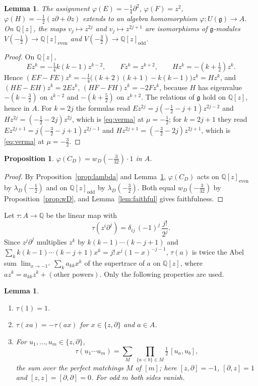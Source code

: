 \documentclass[preprint,12pt]{elsarticle}
\newtheorem{proposition}[theorem]{Proposition}
\newtheorem{lemma}[theorem]{Lemma}
\theoremstyle{definition}
\newcommand{\Q}{\mathbb{Q}}
\newcommand{\g}{\mathfrak{g}}
\newcommand{\Ue}{U(\g)}
\newcommand{\dd}{\partial}
\begin{document}
\begin{lemma}\label{lem:osc}
The assignment $\varphi(E)=-\frac14\dd^2$, $\varphi(F)=z^2$, $\varphi(H)=-\frac12(z\dd+\dd z)$ extends to an algebra homomorphism $\varphi\colon\Ue\to A$. On $\Q[z]$, the maps $v_j\mapsto z^{2j}$ and $v_j\mapsto z^{2j+1}$ are isomorphisms of $\g$-modules $V(-\frac12)\to\Q[z]_{\mathrm{even}}$ and $V(-\frac32)\to\Q[z]_{\mathrm{odd}}$.
\end{lemma}

\begin{proof}
On $\Q[z]$,
\[
Ez^k=-\tfrac14k(k-1)z^{k-2},\qquad Fz^k=z^{k+2},\qquad Hz^k=-(k+\tfrac12)z^k .
\]
Hence $(EF-FE)z^k=-\frac14\bigl((k+2)(k+1)-k(k-1)\bigr)z^k=Hz^k$, and $(HE-EH)z^k=2Ez^k$, $(HF-FH)z^k=-2Fz^k$, because $H$ has eigenvalue $-(k-\frac32)$ on $z^{k-2}$ and $-(k+\frac52)$ on $z^{k+2}$. The relations of $\g$ hold on $\Q[z]$, hence in $A$. For $k=2j$ the formulas read $Ez^{2j}=j(-\frac12-j+1)z^{2j-2}$ and $Hz^{2j}=(-\frac12-2j)z^{2j}$, which is \eqref{eq:verma} at $\mu=-\frac12$; for $k=2j+1$ they read $Ez^{2j+1}=j(-\frac32-j+1)z^{2j-1}$ and $Hz^{2j+1}=(-\frac32-2j)z^{2j+1}$, which is \eqref{eq:verma} at $\mu=-\frac32$.
\end{proof}

\begin{proposition}\label{prop:scalar}
$\varphi(C_D)=w_D(-\frac{3}{32})\cdot1$ in $A$.
\end{proposition}

\begin{proof}
By Proposition~\ref{prop:lambda} and Lemma~\ref{lem:osc}, $\varphi(C_D)$ acts on $\Q[z]_{\mathrm{even}}$ by $\lambda_D(-\frac12)$ and on $\Q[z]_{\mathrm{odd}}$ by $\lambda_D(-\frac32)$. Both equal $w_D(-\frac{3}{32})$ by Proposition~\ref{prop:wD}, and Lemma~\ref{lem:faithful} gives faithfulness.
\end{proof}

Let $\tau\colon A\to\Q$ be the linear map with
\[
\tau(z^i\dd^j)=\delta_{ij}\,(-1)^j\,\frac{j!}{2^j}.
\]
Since $z^j\dd^j$ multiplies $z^k$ by $k(k-1)\cdots(k-j+1)$ and $\sum_kk(k-1)\cdots(k-j+1)x^k=j!\,x^j(1-x)^{-j-1}$, $\tau(a)$ is twice the Abel sum $\lim_{x\to-1^+}\sum_k a_{kk}x^k$ of the supertrace of $a$ on $\Q[z]$, where $az^k=a_{kk}z^k+(\text{other powers})$. Only the following properties are used.

\begin{lemma}\label{lem:tau}
\begin{enumerate}
\item[(a)] $\tau(1)=1$.
\item[(b)] $\tau(xa)=-\tau(ax)$ for $x\in\{z,\dd\}$ and $a\in A$.
\item[(c)] For $u_1,\dots,u_m\in\{z,\dd\}$,
\[
\tau(u_1\cdots u_m)=\sum_{M}\ \prod_{\{a<b\}\in M}\tfrac12\,[u_a,u_b],
\]
the sum over the perfect matchings $M$ of $[m]$; here $[z,\dd]=-1$, $[\dd,z]=1$ and $[z,z]=[\dd,\dd]=0$. For odd $m$ both sides vanish.
\end{enumerate}
\end{lemma}
\end{document}
